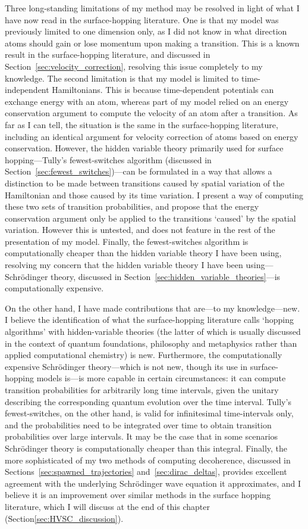 Three long-standing limitations of my method may be resolved in light of what I have now read in the surface-hopping literature. One is that my model was previously limited to one dimension only, as I did not know in what direction atoms should gain or lose momentum upon making a transition. This is a known result in the surface-hopping literature, and discussed in Section~\ref{sec:velocity_correction}, resolving this issue completely to my knowledge. The second limitation is that my model is limited to time-independent Hamiltonians. This is because time-dependent potentials can exchange energy with an atom, whereas part of my model relied on an energy conservation argument to compute the velocity of an atom after a transition. As far as I can tell, the situation is the same in the surface-hopping literature, including an identical argument for velocity correction of atoms based on energy conservation. However, the hidden variable theory primarily used for surface hopping---Tully's fewest-switches algorithm (discussed in Section~\ref{sec:fewest_switches})---can be formulated in a way that allows a distinction to be made between transitions caused by spatial variation of the Hamiltonian and those caused by its time variation. I present a way of computing these two sets of transition probabilities, and propose that the energy conservation argument only be applied to the transitions `caused' by the spatial variation. However this is untested, and does not feature in the rest of the presentation of my model. Finally, the fewest-switches algorithm is computationally cheaper than the hidden variable theory I have been using, resolving my concern that the hidden variable theory I have been using---Schr\"odinger theory, discussed in Section~\ref{sec:hidden_variable_theories}---is computationally expensive.

On the other hand, I have made contributions that are---to my knowledge---new. I believe the identification of what the surface-hopping literature calls `hopping algorithms' with hidden-variable theories (the latter of which is usually discussed in the context of quantum foundations, philosophy and metaphysics rather than applied computational chemistry) is new. Furthermore, the computationally expensive Schr\"odinger theory---which is not new, though its use in surface-hopping models is---is more capable in certain circumstances: it can compute transition probabilities for arbitrarily long time intervals, given the unitary describing the corresponding quantum evolution over the time interval. Tully's fewest-switches, on the other hand, is valid for infinitesimal time-intervals only, and the probabilities need to be integrated over time to obtain transition probabilities over large intervals. It may be the case that in some scenarios Schr\"odinger theory is computationally cheaper than this integral. Finally, the more sophisticated of my two methods of computing decoherence, discussed in Sections~\ref{sec:spawned_trajectories} and~\ref{sec:dirac_deltas}, provides excellent agreement with the underlying Schr\"odinger wave equation it approximates, and I believe it is an improvement over similar methods in the surface hopping literature, which I will discuss at the end of this chapter (Section\ref{sec:HVSC_discussion}).


